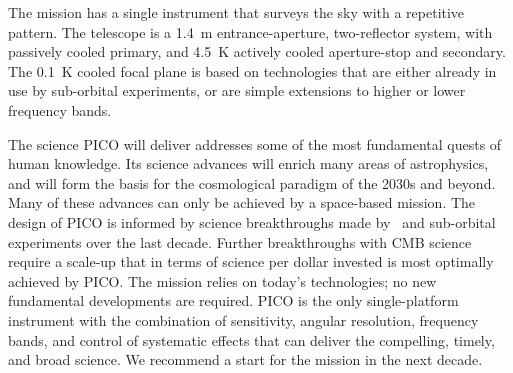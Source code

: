 \documentclass[PICOAPC.tex]{subfiles}
\begin{document}
The mission has a single instrument that surveys the sky with a repetitive pattern.  The telescope is a 1.4~m entrance-aperture, two-reflector system, with passively cooled primary, and 4.5~K actively cooled aperture-stop and secondary. The 0.1~K cooled focal plane is based on technologies that are either already in use by sub-orbital experiments, or are simple extensions to higher or lower frequency bands.  

The science PICO will deliver addresses some of the most fundamental quests of human knowledge. Its science advances will enrich many areas of astrophysics, and will form the basis for the cosmological paradigm of the 2030s and beyond.  Many of these advances can only be achieved by a space-based mission. The design of PICO is informed by science breakthroughs made by \planck\ and sub-orbital experiments over the last decade. Further breakthroughs with CMB science require a scale-up that in terms of science per dollar invested is most optimally achieved by PICO.  
The mission relies on today's technologies; no new fundamental developments are required. PICO is the only single-platform instrument with the combination of sensitivity, angular resolution, frequency bands, and control of systematic effects that can deliver the compelling, timely, and broad science. We recommend a start for the mission in the next decade. 
\end{document}
